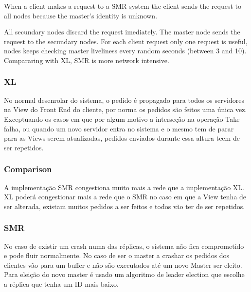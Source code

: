 \documentclass[times, 10pt,twocolumn]{article}
\begin{document}

When a client makes a request to a SMR system the client sends the request to all nodes because the master's identity is unknown.

All secundary nodes discard the request imediately. The master node
sends the request to the secundary nodes. For each client request only one request is useful, nodes keeps checking master liveliness every random seconds (between 3 and 10). Compararing with XL, SMR is more network intensive.

\subsubsection{XL}

No normal desenrolar do sistema, o pedido é propagado para todos os servidores na View do Front End do cliente, por norma os pedidos são feitos
uma única vez. Exceptuando os casos em que por algum motivo a interseção na operação Take falha, ou quando um novo servidor entra no sistema e 
o mesmo tem de parar para as Views serem atualizadas, pedidos enviados durante essa altura teem de ser repetidos.

\subsubsection{Comparison}

A implementação SMR congestiona muito mais a rede que a implementação XL. XL poderá congestionar mais a rede que o SMR no caso em que
a View tenha de ser alterada, existam muitos pedidos a ser feitos e todos vão ter de ser repetidos. 

\subsubsection{SMR}

No caso de existir um crash numa das réplicas, o sistema não fica comprometido e pode fluir normalmente. No caso de ser o master a crashar
os pedidos dos clientes vão para um buffer e não são executados até um novo Master ser eleito. Para eleição do novo master é usado um algoritmo
de leader election que escolhe a réplica que tenha um ID mais baixo.
\end{document}
